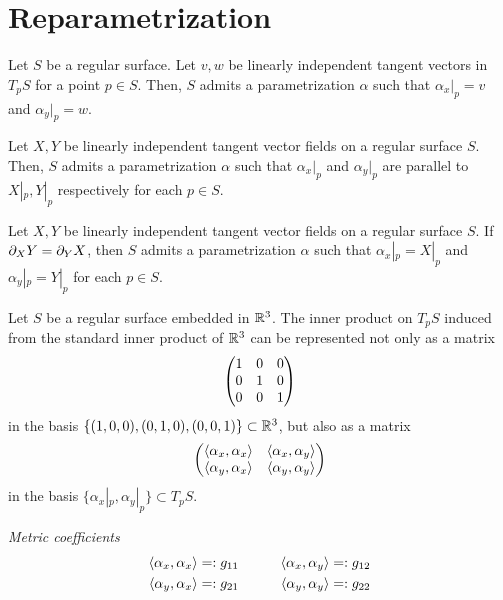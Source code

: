 \documentclass{../note}
\def\a{\alpha}
\begin{document}
\section{Reparametrization}



\begin{thm}
Let $S$ be a regular surface.
Let $v,w$ be linearly independent tangent vectors in $T_pS$ for a point $p\in S$.
Then, $S$ admits a parametrization $\a$ such that $\a_x|_p=v$ and $\a_y|_p=w$.
\end{thm}
\begin{thm}
Let $X,Y$ be linearly independent tangent vector fields on a regular surface $S$.
Then, $S$ admits a parametrization $\a$ such that $\a_x|_p$ and $\a_y|_p$ are parallel to $X|_p,Y|_p$ respectively for each $p\in S$.
\end{thm}
\begin{thm}
Let $X,Y$ be linearly independent tangent vector fields on a regular surface $S$.
If $\pd_XY=\pd_YX$, then $S$ admits a parametrization $\a$ such that $\a_x|_p=X|_p$ and $\a_y|_p=Y|_p$ for each $p\in S$.
\end{thm}

Let $S$ be a regular surface embedded in $\mathbb{R}^3$.
The inner product on $T_pS$ induced from the standard inner product of $\mathbb{R}^3$ can be represented not only as a matrix
\[\begin{pmatrix}1&0&0\\0&1&0\\0&0&1\end{pmatrix}\]
in the basis $\{(1,0,0),(0,1,0),(0,0,1)\}\subset\mathbb{R}^3$, but also as a matrix
\[\mat{\<\a_x,\a_x\>&\<\a_x,\a_y\>\\\<\a_y,\a_x\>&\<\a_y,\a_y\>}\]
in the basis $\{\a_x|_p,\a_y|_p\}\subset T_pS$.

\begin{defn}
\emph{Metric coefficients}
\begin{alignat*}{2}
\<\a_x,\a_x\>&=:g_{11}&\qquad
\<\a_x,\a_y\>&=:g_{12}\\
\<\a_y,\a_x\>&=:g_{21}&
\<\a_y,\a_y\>&=:g_{22}
\end{alignat*}
\end{defn}
\end{document}
